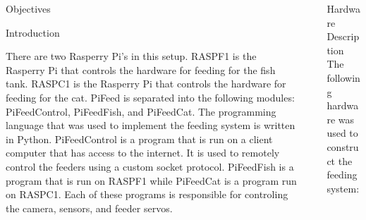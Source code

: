 \documentclass[final]{beamer}
\newlength{\sepwid}
\newlength{\onecolwid}
\newlength{\twocolwid}
\begin{document}
\begin{frame}[t]
\begin{columns}[t]
\begin{column}{\onecolwid}
\begin{alertblock}{Objectives}
\end{alertblock}


\begin{block}{Introduction}

There are two Rasperry Pi's in this setup. RASPF1 is the Rasperry Pi that
controls the hardware for feeding for the fish tank. RASPC1 is the Rasperry Pi that
controls the hardware for feeding for the cat. PiFeed is separated into the
following modules: PiFeedControl, PiFeedFish, and PiFeedCat. The programming
language that was used to implement the feeding system is written in Python.
PiFeedControl is a program that is run on a client computer that has access to
the internet. It is used to remotely control the feeders using a custom socket
protocol. PiFeedFish is a program that is run on RASPF1 while PiFeedCat is a
program run on RASPC1. Each of these programs is responsible for controling the
camera, sensors, and feeder servos.

\end{block}




\end{column} %

\begin{column}{\sepwid}\end{column} %

\begin{column}{\twocolwid} %

\begin{columns}[t,totalwidth=\twocolwid] %

\begin{column}{\onecolwid}\vspace{-.6in} %

\begin{block}{Hardware Description}
The following hardware was used to construct the feeding system:


\end{block}
\end{column}
\end{columns}
\end{column}
\end{columns}
\end{frame}
\end{document}

